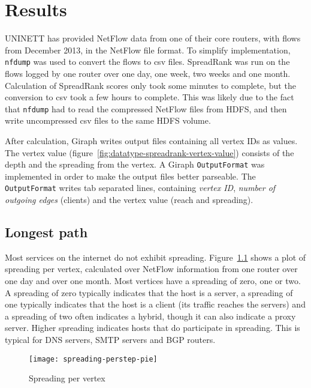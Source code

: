 \chapter{Results}
\label{chp:results}

UNINETT has provided NetFlow data from one of their core routers, with flows from December 2013, in the NetFlow file format.
To simplify implementation, \verb"nfdump" was used to convert the flows to \gls{csv} files.
SpreadRank was run on the flows logged by one router over one day, one week, two weeks and one month.
Calculation of SpreadRank scores only took some minutes to complete,
 but the conversion to \gls{csv} took a few hours to complete.
This was likely due to the fact that \verb"nfdump" had to read the compressed NetFlow files from \gls{HDFS},
 and then write uncompressed \gls{csv} files to the same \gls{HDFS} volume.

After calculation, \gls{Giraph} writes output files containing all vertex IDs as values.
The vertex value (figure~\ref{fig:datatype-spreadrank-vertex-value}) consists of the \gls{depth} and the spreading from the vertex.
A Giraph \verb"OutputFormat" was implemented in order to make the output files better parseable.
The \verb"OutputFormat" writes tab separated lines, containing \emph{vertex ID}, \emph{number of outgoing edges} (clients) and the vertex value (reach and spreading).


\section{Longest path}
Most \gls{service}s on the internet do not exhibit spreading.
Figure~\ref{fig:spreading-perstep-pie} shows a plot of spreading per vertex, calculated over NetFlow information from one router over one day and over one month.
Most vertices have a spreading of zero, one or two.
A spreading of zero typically indicates that the host is a server, a spreading of one typically indicates that the host is a client (its traffic reaches the servers) and a spreading of two often indicates a hybrid, though it can also indicate a proxy server.
Higher spreading indicates hosts that do participate in spreading.
This is typical for DNS servers, SMTP servers and \gls{BGP} routers.

\begin{figure}[h]
	\caption{Spreading per vertex}
	\label{fig:spreading-perstep-pie}
	\centering
		\texttt{[image: spreading-perstep-pie]}
\end{figure}


